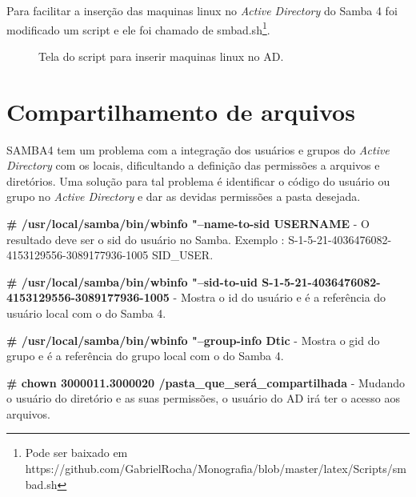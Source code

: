 Para facilitar a inserção das maquinas linux no \textit{Active Directory} do Samba 4 foi modificado um script e ele foi chamado de smbad.sh\footnote[4]{Pode ser baixado em https://github.com/GabrielRocha/Monografia/blob/master/latex/Scripts/smbad.sh}. 

\begin{figure}[ht]
   	\centering
   	\caption{Tela do script para inserir maquinas linux no AD.}
    \label{smbad}
\end{figure}

\section{Compartilhamento de arquivos}

SAMBA4 tem um problema com a integração dos usuários e grupos do \textit{Active Directory} com os locais, dificultando a definição das permissões a arquivos e diretórios. Uma solução para tal problema é identificar o código do usuário ou grupo no \textit{Active Directory} e dar as devidas permissões a pasta desejada.

\noindent \textbf{\# /usr/local/samba/bin/wbinfo "--name-to-sid USERNAME} - O resultado deve ser o sid do usuário no Samba. Exemplo : S-1-5-21-4036476082-4153129556-3089177936-1005 SID\_USER.

\noindent \textbf{\# /usr/local/samba/bin/wbinfo "--sid-to-uid S-1-5-21-4036476082-4153129556-3089177936-1005} - Mostra o id do usuário e é a referência do usuário local com o do Samba 4.

\noindent \textbf{\# /usr/local/samba/bin/wbinfo "--group-info Dtic} - Mostra o gid do grupo e é a referência do grupo local com o do Samba 4.

\noindent \textbf{\# chown 3000011.3000020 /pasta\_que\_será\_compartilhada} - Mudando o usuário do diretório e as suas permissões, o usuário do AD irá ter o acesso aos arquivos.


